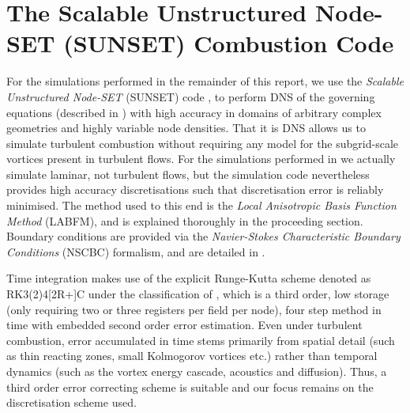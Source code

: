 \section{The Scalable Unstructured Node-SET (SUNSET) Combustion Code}

For the simulations performed in the remainder of this report, we use the \emph{Scalable Unstructured Node-SET} (SUNSET) code \cite{kingSunsetFlamesDNSCode,king2024MeshFreeFrameworkHighOrdera}, to perform DNS of the governing equations (described in ) with high accuracy in domains of arbitrary complex geometries and highly variable node densities. That it is DNS allows us to simulate turbulent combustion without requiring any model for the subgrid-scale vortices present in turbulent flows. For the simulations performed in  we actually simulate laminar, not turbulent flows, but the simulation code nevertheless provides high accuracy discretisations such that discretisation error is reliably minimised. The method used to this end is the \emph{Local Anisotropic Basis Function Method} (LABFM), and is explained thoroughly in the proceeding section. Boundary conditions are provided via the \emph{Navier-Stokes Characteristic Boundary Conditions} (NSCBC) formalism, and are detailed in .

Time integration makes use of the explicit Runge-Kutta scheme denoted as RK3(2)4[2R+]C under the classification of \cite{kennedy2000LowStorageExplicitRunge}, which is a third order, low storage (only requiring two or three registers per field per node), four step method in time with embedded second order error estimation. Even under turbulent combustion, error accumulated in time stems primarily from spatial detail (such as thin reacting zones, small Kolmogorov vortices etc.) rather than temporal dynamics (such as the vortex energy cascade, acoustics and diffusion). Thus, a third order error correcting scheme is suitable and our focus remains on the discretisation scheme used.

